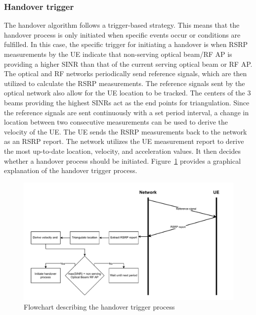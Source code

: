 \subsubsection{Handover trigger}
The handover algorithm follows a trigger-based strategy. This means that the handover process is only initiated when specific events occur or conditions are fulfilled. In this case, the specific trigger for initiating a handover is when RSRP measurements by the UE indicate that non-serving optical beam/RF AP is providing a higher SINR than that of the current serving optical beam or RF AP. The optical and RF networks periodically send reference signals, which are then utilized to calculate the RSRP measurements. The reference signals sent by the optical network also allow for the UE location to be tracked. The centers of the 3 beams providing the highest SINRs act as the end points for triangulation. Since the reference signals are sent continuously with a set period interval, a change in location between two consecutive measurements can be used to derive the velocity of the UE. The UE sends the RSRP measurements back to the network as an RSRP report. The network utilizes the UE measurement report to derive the most up-to-date location, velocity, and acceleration values. It then decides whether a handover process should be initiated. Figure~\ref{fig: handover-trigger} provides a graphical explanation of the handover trigger process.
% 
\begin{figure}
    \centering
    \includegraphics[width=1\linewidth]{Figures/Algorithm-design-Handover-trigger.drawio.pdf}
    \caption{Flowchart describing the handover trigger process}
    \label{fig: handover-trigger}
\end{figure}

